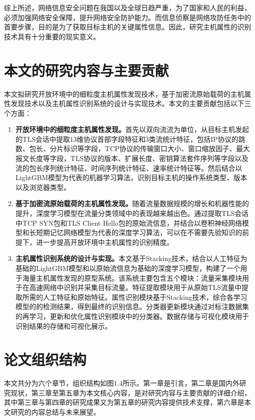 综上所述，网络信息安全问题在我国以及全球日趋严重，为了国家和人民的利益，必须加强网络安全保障，提升网络安全防护能力。而信息侦察是网络攻防任务中的首要步骤，目的是为了获取目标主机的关键属性信息。因此，研究主机属性的识别技术具有十分重要的现实意义。


\section{本文的研究内容与主要贡献}

本文拟研究开放环境中的细粒度主机属性发现技术，基于加密流原始载荷的主机属性发现技术以及主机属性识别系统的设计与实现技术。本文的主要贡献包括以下三个方面：
\begin{enumerate}
    \item \textbf{开放环境中的细粒度主机属性发现。}首先以双向流流为单位，从目标主机发起的TLS会话中提取13维协议首部字段特征和3类流统计特征，包括IP协议的跳数、包长、分片标识等字段，TCP协议的传输窗口大小、窗口缩放因子、最大报文长度等字段，TLS协议的版本、扩展长度、密钥算法套件序列等字段以及流的包长序列统计特征、时间序列统计特征、速率统计特征等。然后结合以LightGBM模型为代表的机器学习算法，识别目标主机的操作系统类型、版本以及浏览器类型。
    \item \textbf{基于加密流原始载荷的主机属性发现。}随着流量数据规模的增长和机器性能的提升，深度学习模型在流量分类领域中的表现越来越出色。通过提取TLS会话中TCP SYN包和TLS Client Hello包的原始流信息，并结合以卷积神经网络模型和长短期记忆网络模型为代表的深度学习算法，可以在不需要先验知识的前提下，进一步提高开放环境中主机属性的识别精度。
    \item \textbf{主机属性识别系统的设计与实现。}本文基于Stacking技术，结合以人工特征为基础的LightGBM模型和以原始流信息为基础的深度学习模型，构建了一个用于海量主机属性发现的原型系统。该系统主要包含五个模块：流量采集模块用于在高速网络中识别并采集目标流量。特征提取模块用于从原始TLS流量中提取所需的人工特征和原始特征。属性识别模块基于Stacking技术，综合各学习模型的的检测结果，得到最终的识别信息。分类器更新模块通过对标注数据集的再学习，更新和优化属性识别模块中的分类器。数据存储与可视化模块用于识别结果的存储和可视化展示。
\end{enumerate}

\section{论文组织结构}

本文共分为六个章节，组织结构如图1.4所示。第一章是引言，第二章是国内外研究现状，第三章至第五章为本文核心内容，是对研究内容与主要贡献的详细介绍，其中第三章与第四章的研究成果又为第五章的研究内容提供技术支撑，第六章是本文研究的内容总结与未来展望。

